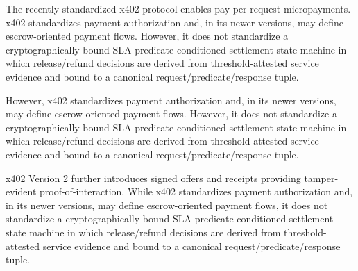 
The recently standardized x402 protocol enables pay-per-request micropayments. x402 standardizes payment authorization and, in its newer versions, may define escrow-oriented payment flows. However, it does not standardize a cryptographically bound SLA-predicate-conditioned settlement state machine in which release/refund decisions are derived from threshold-attested service evidence and bound to a canonical request/predicate/response tuple.

However, x402 standardizes payment authorization and, in its newer versions, may define escrow-oriented payment flows. However, it does not standardize a cryptographically bound SLA-predicate-conditioned settlement state machine in which release/refund decisions are derived from threshold-attested service evidence and bound to a canonical request/predicate/response tuple.

x402 Version 2 further introduces signed offers and receipts providing tamper-evident proof-of-interaction. While x402 standardizes payment authorization and, in its newer versions, may define escrow-oriented payment flows, it does not standardize a cryptographically bound SLA-predicate-conditioned settlement state machine in which release/refund decisions are derived from threshold-attested service evidence and bound to a canonical request/predicate/response tuple.
